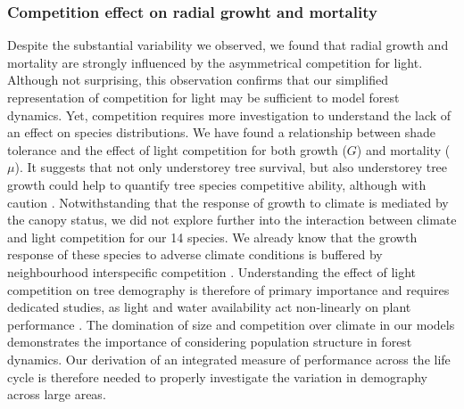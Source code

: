 \subsubsection{Competition effect on radial growht and mortality}
Despite the substantial variability we observed, we found that radial growth and mortality are strongly influenced by the asymmetrical competition for light. Although not surprising, this observation confirms that our simplified representation of competition for light may be sufficient to model forest dynamics. Yet, competition requires more investigation to understand the lack of an effect on species distributions. We have found a relationship between shade tolerance and the effect of light competition for both growth ($ G $) and mortality ($ \mu $). It suggests that not only understorey tree survival, but also understorey tree growth could help to quantify tree species competitive ability, although with caution \citep{Feng2018}. Notwithstanding that the response of growth to climate is mediated by the canopy status, we did not explore further into the interaction between climate and light competition for our 14 species. We already know that the growth response of these species to adverse climate conditions is buffered by neighbourhood interspecific competition \citep{Aussenac2019}. Understanding the effect of light competition on tree demography is therefore of primary importance and requires dedicated studies, as light and water availability act non-linearly on plant performance \citep{Holmgren2012}. The domination of size and competition over climate in our models demonstrates the importance of considering population structure in forest dynamics. Our derivation of an integrated measure of performance across the life cycle is therefore needed to properly investigate the variation in demography across large areas. \\

